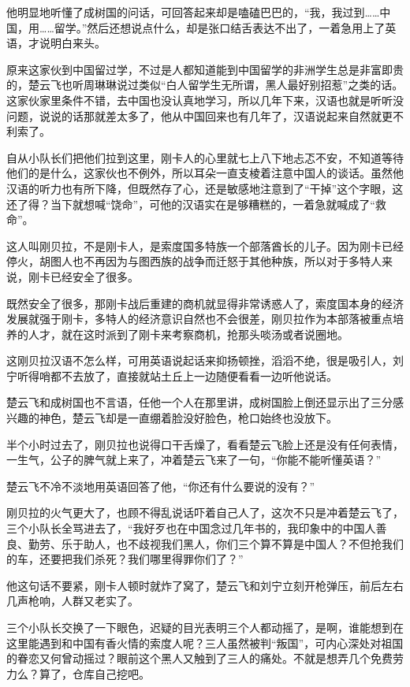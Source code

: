 他明显地听懂了成树国的问话，可回答起来却是嗑磕巴巴的，“我，我过到……中国，用……留学。”然后还想说点什么，却是张口结舌表达不出了，一着急用上了英语，才说明白来头。

原来这家伙到中国留过学，不过是人都知道能到中国留学的非洲学生总是非富即贵的，楚云飞也听周琳琳说过类似“白人留学生无所谓，黑人最好别招惹”之类的话。这家伙家里条件不错，去中国也没认真地学习，所以几年下来，汉语也就是听听没问题，说说的话那就差太多了，他从中国回来也有几年了，汉语说起来自然就更不利索了。

自从小队长们把他们拉到这里，刚卡人的心里就七上八下地忐忑不安，不知道等待他们的是什么，这家伙也不例外，所以耳朵一直支棱着注意中国人的谈话。虽然他汉语的听力也有所下降，但既然存了心，还是敏感地注意到了“干掉”这个字眼，这还了得？当下就想喊“饶命”，可他的汉语实在是够糟糕的，一着急就喊成了“救命”。

这人叫刚贝拉，不是刚卡人，是索度国多特族一个部落酋长的儿子。因为刚卡已经停火，胡图人也不再因为与图西族的战争而迁怒于其他种族，所以对于多特人来说，刚卡已经安全了很多。

既然安全了很多，那刚卡战后重建的商机就显得非常诱惑人了，索度国本身的经济发展就强于刚卡，多特人的经济意识自然也不会很差，刚贝拉作为本部落被重点培养的人才，就在这时派到了刚卡来考察商机，抢那头啖汤或者说圈地。

这刚贝拉汉语不怎么样，可用英语说起话来抑扬顿挫，滔滔不绝，很是吸引人，刘宁听得哨都不去放了，直接就站土丘上一边随便看看一边听他说话。

楚云飞和成树国也不言语，任他一个人在那里讲，成树国脸上倒还显示出了三分感兴趣的神色，楚云飞却是一直绷着脸没好脸色，枪口始终也没放下。

半个小时过去了，刚贝拉也说得口干舌燥了，看看楚云飞脸上还是没有任何表情，一生气，公子的脾气就上来了，冲着楚云飞来了一句，“你能不能听懂英语？”

楚云飞不冷不淡地用英语回答了他，“你还有什么要说的没有？”

刚贝拉的火气更大了，也顾不得乱说话吓着自己人了，这次不只是冲着楚云飞了，三个小队长全骂进去了，“我好歹也在中国念过几年书的，我印象中的中国人善良、勤劳、乐于助人，也不歧视我们黑人，你们三个算不算是中国人？不但抢我们的车，还要把我们杀死？我们哪里得罪你们了？”

他这句话不要紧，刚卡人顿时就炸了窝了，楚云飞和刘宁立刻开枪弹压，前后左右几声枪响，人群又老实了。

三个小队长交换了一下眼色，迟疑的目光表明三个人都动摇了，是啊，谁能想到在这里能遇到和中国有香火情的索度人呢？三人虽然被判“叛国”，可内心深处对祖国的眷恋又何曾动摇过？眼前这个黑人又触到了三人的痛处。不就是想弄几个免费劳力么？算了，仓库自己挖吧。


